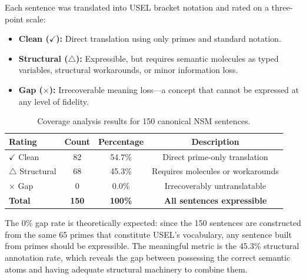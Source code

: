 \documentclass[11pt,a4paper]{article}
\begin{document}
Each sentence was translated into USEL bracket notation and rated on a three-point scale:

\begin{itemize}[nosep]
    \item \textbf{Clean ($\checkmark$):} Direct translation using only primes and standard notation.
    \item \textbf{Structural ($\triangle$):} Expressible, but requires semantic molecules as typed variables, structural workarounds, or minor information loss.
    \item \textbf{Gap ($\times$):} Irrecoverable meaning loss---a concept that cannot be expressed at any level of fidelity.
\end{itemize}

\begin{table}[h!]
\centering
\caption{Coverage analysis results for 150 canonical NSM sentences.}
\label{tab:coverage-results}
\begin{tabular}{lccc}
\toprule
\textbf{Rating} & \textbf{Count} & \textbf{Percentage} & \textbf{Description} \\
\midrule
$\checkmark$ Clean & 82 & 54.7\% & Direct prime-only translation \\
$\triangle$ Structural & 68 & 45.3\% & Requires molecules or workarounds \\
$\times$ Gap & 0 & 0.0\% & Irrecoverably untranslatable \\
\midrule
\textbf{Total} & \textbf{150} & \textbf{100\%} & \textbf{All sentences expressible} \\
\bottomrule
\end{tabular}
\end{table}

The 0\% gap rate is theoretically expected: since the 150 sentences are constructed from the same 65 primes that constitute USEL's vocabulary, any sentence built from primes should be expressible. The meaningful metric is the 45.3\% structural annotation rate, which reveals the gap between possessing the correct semantic atoms and having adequate structural machinery to combine them.
\end{document}
